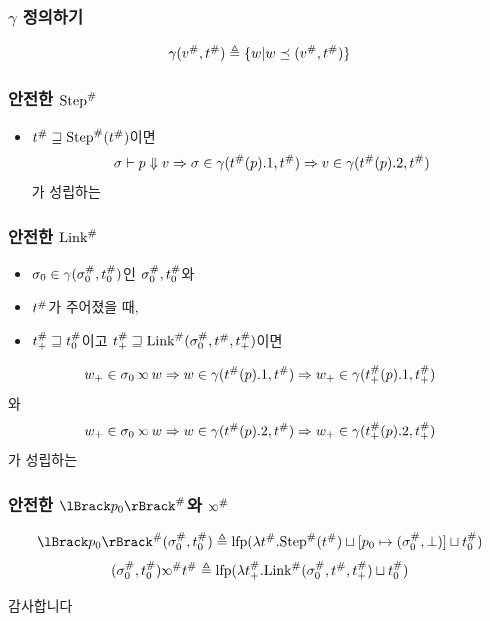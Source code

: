 \documentclass{beamer}
\begin{document}
\begin{frame}
	\frametitle{$\gamma$ 정의하기}
	\[\gamma({v}^{\#},{t}^{\#})\triangleq\{w|w\preceq({v}^{\#},{t}^{\#})\}\]
\end{frame}
\begin{frame}[c,fragile]
	\frametitle{안전한 ${\text{Step}}^{\#}$}
	\begin{itemize}
		\item ${t}^{\#}\sqsupseteq{\text{Step}}^{\#}({t}^{\#})$이면
		      \[{\sigma}\vdash{p}\Downarrow{v}\Rightarrow\sigma\in\gamma({t}^{\#}(p).1,{t}^{\#})\Rightarrow v\in\gamma({t}^{\#}(p).2,{t}^{\#})\]
		      가 성립하는
	\end{itemize}
\end{frame}
\begin{frame}[c,fragile]
	\frametitle{안전한 ${\text{Link}}^{\#}$}
	\begin{itemize}
		\item $\sigma_0\in\gamma({\sigma}^{\#}_0,{t}^{\#}_0)$인 ${\sigma}^{\#}_0,{t}^{\#}_0$와
		\item ${t}^{\#}$가 주어졌을 때,
		\item ${t}^{\#}_+\sqsupseteq{t}^{\#}_0$이고 ${t}^{\#}_+\sqsupseteq{\text{Link}}^{\#}({\sigma}^{\#}_0,{t}^{\#},{t}^{\#}_+)$이면
	\end{itemize}
	\[w_+\in\ctx_0\semlink w\Rightarrow w\in\gamma(\Abs\ptree(p).1,\Abs\ptree)\Rightarrow w_+\in\gamma(\Abs\ptree_+(p).1,\Abs\ptree_+)\]
	와
	\[w_+\in\ctx_0\semlink w\Rightarrow w\in\gamma(\Abs\ptree(p).2,\Abs\ptree)\Rightarrow w_+\in\gamma(\Abs\ptree_+(p).2,\Abs\ptree_+)\]
	가 성립하는
\end{frame}
\begin{frame}
	\frametitle{안전한 $\Abs{\sembracket{p_0}}$와 $\Abs\semlink$}
	\[\Abs{\sembracket{p_0}}(\Abs\ctx_0,\Abs\ptree_0)\triangleq\lfp(\lambda\Abs\ptree.\Abs\Step(\Abs\ptree)\sqcup[p_0\mapsto(\Abs\ctx_0,\bot)]\sqcup\Abs\ptree_0)\]
	\[(\Abs\ctx_0,\Abs\ptree_0)\Abs\semlink\Abs\ptree\triangleq\lfp(\lambda\Abs\ptree_+.\Abs\Link(\Abs\ctx_0,\Abs\ptree,\Abs\ptree_+)\sqcup\Abs\ptree_0)\]
\end{frame}
\begin{frame}
	\begin{center}\LARGE
		감사합니다
	\end{center}
\end{frame}
\end{document}

